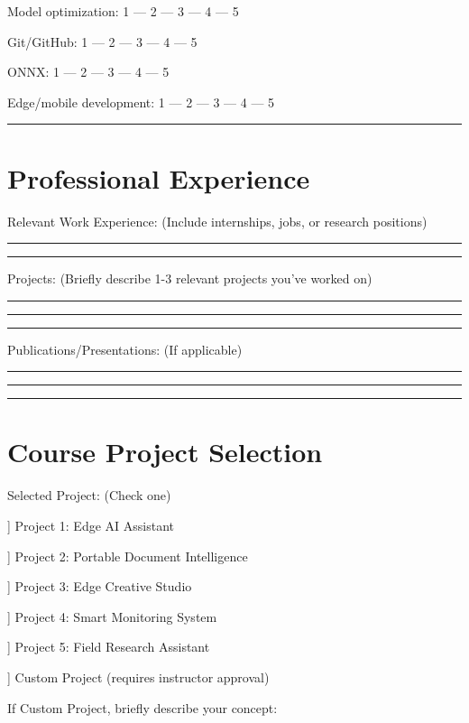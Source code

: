 \documentclass[11pt]{article}
\begin{document}
	\noindent Model optimization: 1 --- 2 --- 3 --- 4 --- 5
	
	\noindent Git/GitHub: 1 --- 2 --- 3 --- 4 --- 5
	
	\noindent ONNX: 1 --- 2 --- 3 --- 4 --- 5
	
	\noindent Edge/mobile development: 1 --- 2 --- 3 --- 4 --- 5
	
	\noindent\rule{\textwidth}{0.4pt}
	
	\section{Professional Experience}
	
	\noindent Relevant Work Experience: (Include internships, jobs, or research positions)
	
	\noindent\rule{\textwidth}{0.4pt}
	
	\noindent\rule{\textwidth}{0.4pt}
	
	\noindent Projects: (Briefly describe 1-3 relevant projects you've worked on)
	
	\noindent\rule{\textwidth}{0.4pt}
	
	\noindent\rule{\textwidth}{0.4pt}
	
	\noindent\rule{\textwidth}{0.4pt}
	
	\noindent Publications/Presentations: (If applicable)
	
	\noindent\rule{\textwidth}{0.4pt}
	
	\noindent\rule{\textwidth}{0.4pt}
	
	\noindent\rule{\textwidth}{0.4pt}
	
	\section{Course Project Selection}
	
	\noindent Selected Project: (Check one)
	
	\noindent {[} {]} Project 1: Edge AI Assistant
	
	\noindent {[} {]} Project 2: Portable Document Intelligence
	
	\noindent {[} {]} Project 3: Edge Creative Studio
	
	\noindent {[} {]} Project 4: Smart Monitoring System
	
	\noindent {[} {]} Project 5: Field Research Assistant
	
	\noindent {[} {]} Custom Project (requires instructor approval)
	
	\noindent If Custom Project, briefly describe your concept:
	
\end{document}
